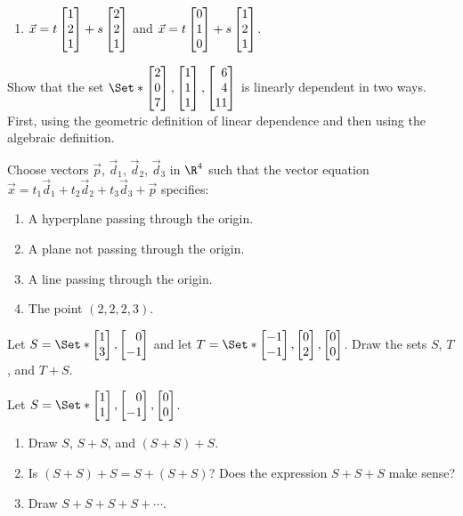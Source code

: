 \begin{exercises}
\begin{problist}
\begin{enumerate}
			\item $\vec x = t\mat{1\\2\\1}+ s\mat{2\\2\\1}$ and $\vec
				x = t\mat{0\\1\\0}+ s\mat{1\\2\\1}$.
		\end{enumerate}
		
		\prob Show that the set $\Set*{\mat{2\\0\\7},\mat{1\\1\\1},\mat{6\\4\\11}}$
		is linearly dependent in two ways. First, using the geometric definition of linear dependence
		and then using the algebraic definition.

		\prob Choose vectors $\vec p$, $\vec d_{1}$, $\vec d_{2}$,
		$\vec d_{3}$ in $\R^{4}$ such that the vector equation
		$\vec x = t_{1}\vec d_{1} + t_{2}\vec d_{2} + t_{3}\vec d_{3}+\vec p$ specifies:
		\begin{enumerate}
			\item A hyperplane passing through the origin.

			\item A plane not passing through the origin.

			\item A line passing through the origin.

			\item The point $(2,2,2,3)$.
		\end{enumerate}

		\prob Let $S=\Set*{\mat{1\\3},\mat{0\\-1}}$ and let $T=\Set*{\mat{-1\\-1},\mat{0\\2},\mat{0\\0}}$. Draw
		the sets $S$, $T$, and $T+S$.

		\prob Let $S=\Set*{\mat{1\\1},\mat{0\\-1}, \mat{0\\0}}$. 
		\begin{enumerate}
			\item 
				Draw $S$, $S+S$, and $(S+S)+S$.
			\item Is $(S+S)+S=S+(S+S)$? Does the expression $S+S+S$ make sense?
			\item Draw $S+S+S+S+\cdots$.
		\end{enumerate}


\end{problist}
\end{exercises}
